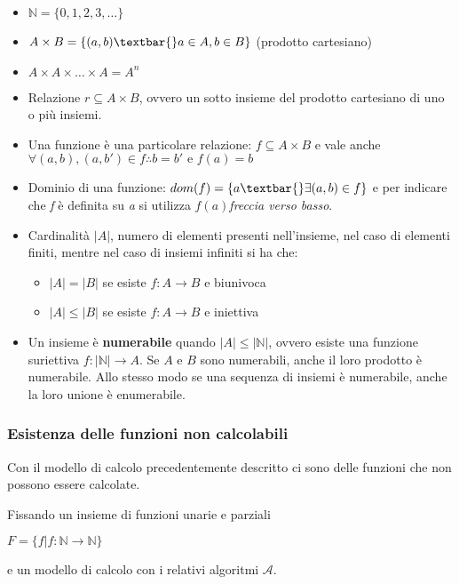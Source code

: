 \begin{itemize}
\item
  $ \mathbb{N}= \{0,1,2,3,\ldots{}\}$
\item
  $A \times B = \{(a,b) \textbar{} a \in A, b \in B\}$ (prodotto cartesiano)
\item
  $A \times A \times \ldots \times A = A^n$
\item
  Relazione $r \subseteq A \times B$, ovvero un sotto insieme del prodotto
  cartesiano di uno o più insiemi.
\item
  Una funzione è una particolare relazione: $f \subseteq A \times B$ e vale anche
  $\forall(a,b), (a,b') \in f \therefore b = b' \text{ e } f(a) = b$
\item
  Dominio di una funzione: $dom(f) = \{a \textbar{} \exists (a,b) \in f\}$ e
  per indicare che \textit{f} è definita su \textit{a} si utilizza $f(a)$\emph{freccia verso
  basso}.
\item
  Cardinalità $|A|$, numero di elementi presenti
  nell'insieme, nel caso di elementi finiti, mentre nel caso di insiemi
  infiniti si ha che:

  \begin{itemize}
  \item $|A| = |B|$ se esiste $f: A \rightarrow B$ e biunivoca
  \item $|A| \leq |B|$ se esiste $f: A \rightarrow B$ e iniettiva
  \end{itemize}
\item
  Un insieme è \textbf{numerabile} quando $|A| \leq |\mathbb{N}|$, ovvero esiste una funzione suriettiva $f: |\mathbb{N}| \rightarrow A$. 
  Se $ A $ e $ B $ sono numerabili, anche il
  loro prodotto è numerabile. Allo stesso modo se una sequenza di
  insiemi è numerabile, anche la loro unione è enumerabile.
\end{itemize}

\subsubsection{Esistenza delle funzioni non
calcolabili}\label{esistenza-delle-funzioni-non-calcolabili}

Con il modello di calcolo precedentemente descritto ci sono delle
funzioni che non possono essere calcolate.

Fissando un insieme di funzioni unarie e parziali

$ F = \{f | f: \mathbb{N} \rightarrow \mathbb{N}\}$

e un modello di calcolo con i relativi algoritmi $\mathcal{A}$.

